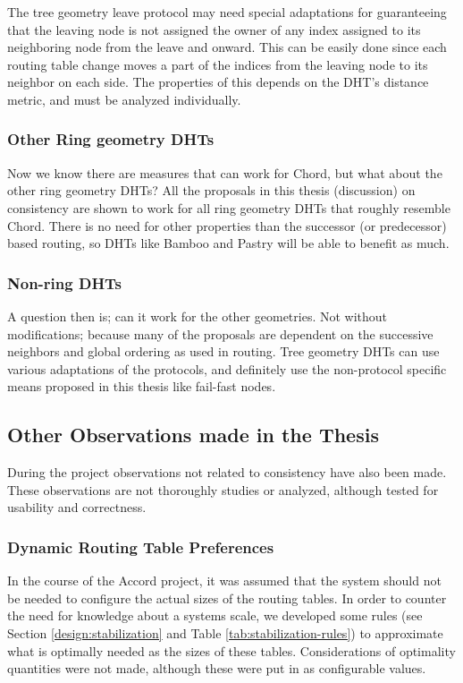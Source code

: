 The tree geometry leave protocol may need special adaptations for guaranteeing that
 the leaving node is not assigned the owner of any index assigned to its neighboring
 node from the leave and onward. This can be easily done since each routing table change
 moves a part of the indices from the leaving node to its neighbor on each side.
 The properties of this depends on the DHT's distance metric,
 and must be analyzed individually.

\subsubsection{Other Ring geometry DHTs}

Now we know there are measures that can work for Chord, but what about the other
 ring geometry DHTs? All the proposals in this thesis (discussion) on consistency
 are shown to work for all ring geometry DHTs that roughly resemble Chord. There is no need
 for other properties than the successor (or predecessor) based routing, so DHTs
 like Bamboo and Pastry will be able to benefit as much.

\subsubsection{Non-ring DHTs}

A question then is; can it work for the other geometries. Not without modifications;
 because
 many of the proposals are dependent on the successive neighbors and global
 ordering as used in routing. Tree geometry DHTs can use various adaptations of the
 protocols, and definitely use the non-protocol specific means proposed in this
 thesis like fail-fast nodes.

\subsection{Other Observations made in the Thesis}

During the project observations not related to consistency have also been made.
 These observations are not thoroughly studies or analyzed, although tested
 for usability and correctness.

\subsubsection{Dynamic Routing Table Preferences}

In the course of the Accord project, it was assumed that the system should not be
 needed to configure the actual sizes of the routing tables. In order to counter
 the need for knowledge about a systems scale, we developed some rules (see
 Section \ref{design:stabilization} and Table \ref{tab:stabilization-rules}) to
 approximate what is optimally needed as the sizes of these tables. Considerations
 of optimality quantities were not made, although these were put in as configurable
 values.

